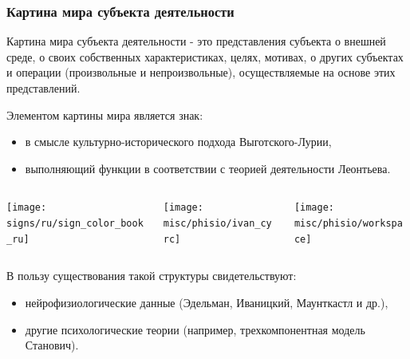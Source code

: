 \documentclass[default]{beamer}
\begin{document}
	\begin{frame}
		\frametitle{Картина мира субъекта деятельности}
		\scriptsize
		Картина мира субъекта деятельности - это представления субъекта о внешней среде, о своих собственных характеристиках, целях, мотивах, о других субъектах и операции (произвольные и непроизвольные), осуществляемые на основе этих представлений.
		\par\smallskip
		Элементом картины мира является знак:
		\begin{itemize}
			\item в смысле культурно-исторического подхода Выготского-Лурии,
			\item выполняющий функции в соответствии с теорией деятельности Леонтьева.
		\end{itemize}
		\begin{columns}
			\begin{column}{0.4\textwidth}
				\centering
				\texttt{[image: signs/ru/sign\_color\_book\_ru]}
			\end{column}
			\begin{column}{0.6\textwidth}
				\begin{columns}
					\begin{column}{0.5\textwidth}
						\centering
						\texttt{[image: misc/phisio/ivan\_cyrc]}
					\end{column}
					\begin{column}{0.5\textwidth}
						\centering
						\texttt{[image: misc/phisio/workspace]}
					\end{column}
				\end{columns}
				
			\end{column}
		\end{columns}
		В пользу существования такой структуры свидетельствуют:
		\begin{itemize}
			\item нейрофизиологические данные (Эдельман, Иваницкий, Маунткастл и др.),
			\item другие психологические теории (например, трехкомпонентная модель Станович).
		\end{itemize}
		\vspace{-5pt}
		\nocite{*}
		\printbibliography[keyword={sign}, resetnumbers=true]
		\end{frame}
		
\end{document}
